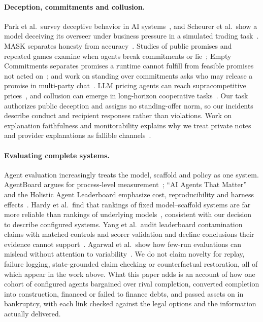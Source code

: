 \paragraph{Deception, commitments and collusion.}
Park et al.\ survey deceptive behavior in AI systems~\cite{park2024aideception}, and Scheurer et al.\ show a model deceiving its overseer under business pressure in a simulated trading task~\cite{scheurer2023pressure}. MASK separates honesty from accuracy~\cite{ren2025mask}. Studies of public promises and repeated games examine when agents break commitments or lie~\cite{shi2026cheaptalk,shi2026agentslie}; Empty Commitments separates promises a runtime cannot fulfill from feasible promises not acted on~\cite{empty_commitments_v2}; and work on standing over commitments asks who may release a promise in multi-party chat~\cite{commitment_standing}. LLM pricing agents can reach supracompetitive prices~\cite{fish2024collusion}, and collusion can emerge in long-horizon cooperative tasks~\cite{shi2026emergentcollusion}. Our task authorizes public deception and assigns no standing-offer norm, so our incidents describe conduct and recipient responses rather than violations. Work on explanation faithfulness and monitorability explains why we treat private notes and provider explanations as fallible channels~\cite{turpin2023unfaithful,lanham2023faithfulness,chen2025cotfaithful,korbak2025monitorability}.

\paragraph{Evaluating complete systems.}
Agent evaluation increasingly treats the model, scaffold and policy as one system. AgentBoard argues for process-level measurement~\cite{ma2024agentboard}; ``AI Agents That Matter'' and the Holistic Agent Leaderboard emphasize cost, reproducibility and harness effects~\cite{kapoor2024agentsthatmatter,kapoor2026hal}. Hardy et al.\ find that rankings of fixed model--scaffold systems are far more reliable than rankings of underlying models~\cite{hardy2026reliability}, consistent with our decision to describe configured systems. Yang et al.\ audit leaderboard contamination claims with matched controls and scorer validation and decline conclusions their evidence cannot support~\cite{yang2026measurementfirst}. Agarwal et al.\ show how few-run evaluations can mislead without attention to variability~\cite{agarwal2021precipice}. We do not claim novelty for replay, failure logging, state-grounded claim checking or counterfactual restoration, all of which appear in the work above. What this paper adds is an account of how one cohort of configured agents bargained over rival completion, converted completion into construction, financed or failed to finance debts, and passed assets on in bankruptcy, with each link checked against the legal options and the information actually delivered.
